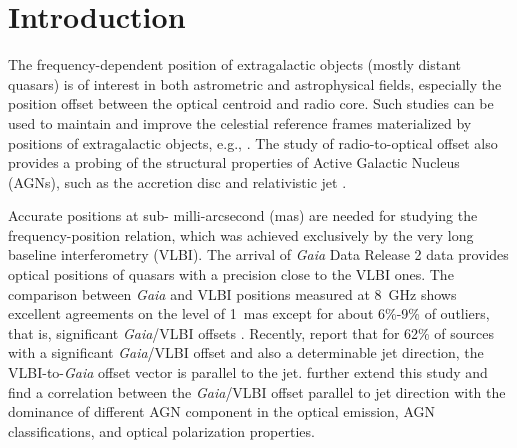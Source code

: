 \documentclass{aa}
\begin{document}

\maketitle


\section{Introduction}     \label{sec:introduction}

   The frequency-dependent position of extragalactic objects (mostly distant quasars) is of interest in both astrometric and astrophysical fields, especially the position offset between the optical centroid and radio core.
   Such studies can be used to maintain and improve the celestial reference frames materialized by positions of extragalactic objects, e.g., \citet{2010A&A...510A..10A,2011A&A...532A.115C,2013MNRAS.430.2797A,2014JGeod..88..575S}.
   The study of radio-to-optical offset also provides a probing of the structural properties of Active Galactic Nucleus (AGNs), such as the accretion disc and relativistic jet \citep[e.g.,][]{2013A&A...553A..13O,2019ApJ...871..143P}.

   Accurate positions at sub- milli-arcsecond (mas) are needed for studying the frequency-position relation, which was achieved exclusively by the very long baseline interferometry (VLBI).
   The arrival of \textit{Gaia} Data Release 2 \citep[\textit{Gaia} DR2;][]{2016A&A...595A...1G,2018A&A...616A...1G} data provides optical positions of quasars with a precision close to the VLBI ones.
   The comparison between \textit{Gaia} and VLBI positions measured at 8~GHz shows excellent agreements on the level of 1~mas except for about 6\%-9\% of outliers, that is, significant \textit{Gaia}/VLBI offsets \citep{2016A&A...595A...5M,2018A&A...616A..14G,2017MNRAS.471.3775P,2017MNRAS.467L..71P,2017A&A...598L...1K,2017ApJ...835L..30M,2018AJ....155..229F,2019MNRAS.482.3023P,2019ApJ...871..143P,2020MNRAS.493L..54K}.
   Recently, \citet{2019MNRAS.482.3023P} report that for 62\% of sources with a significant \textit{Gaia}/VLBI offset and also a determinable jet direction, the VLBI-to-\textit{Gaia} offset vector is parallel to the jet.
   \citet{2019ApJ...871..143P,2020MNRAS.493L..54K} further extend this study and find a correlation between the \textit{Gaia}/VLBI offset parallel to jet direction with the dominance of different AGN component in the optical emission, AGN classifications, and optical polarization properties.
\end{document}
